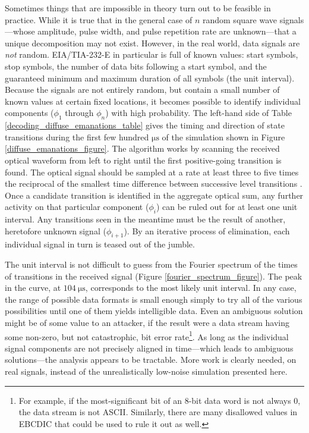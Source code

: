 \documentclass{acmtrans2e}
\begin{document}
Sometimes things that are impossible in theory turn out to be feasible
in practice.  While it is true that in the general case of $n$ random square
wave signals---whose amplitude, pulse width, and pulse repetition rate are
unknown---that a unique decomposition may not exist.  However, in the real
world, data signals are {\it not} random.  EIA/TIA-232-E in particular is full
of known values: start symbols, stop symbols, the number of data bits following
a start symbol, and the guaranteed minimum and maximum duration of all symbols
(the unit interval).  Because the signals are not entirely random, but contain
a small number of known values at certain fixed locations, it becomes possible
to identify individual components ($\phi_1$ through $\phi_n$) with high
probability.  The left-hand side of Table \ref{decoding_diffuse_emanations_table}
gives the timing and direction of state transitions during the first few hundred
$\mathrm{\mu s}$ of the simulation shown in Figure \ref{diffuse_emanations_figure}.
The algorithm works by scanning the received optical waveform from left to
right until the first positive-going transition is found.  The optical signal
should be sampled at a rate at least three to five times the reciprocal of the
smallest time difference between successive level transitions \cite{McCarthy}.
Once a candidate transition is identified in the aggregate optical sum, any further
activity on that particular component ($\phi_i$) can be ruled out for at least
one unit interval.  Any transitions seen in the meantime must be the result of
another, heretofore unknown signal ($\phi_{i+1}$).  By an iterative process of
elimination, each individual signal in turn is teased out of the jumble.

The unit interval is not difficult to guess from the Fourier spectrum of the
times of transitions in the received signal
(Figure \ref{fourier_spectrum_figure}).  The peak in the curve, at
$104 \ \mathrm{\mu s}$, corresponds to the most likely unit interval.  In
any case, the range of possible data formats is small enough simply
to try all of the various possibilities until one of them yields intelligible data.
Even an ambiguous solution might be of some value to an attacker, if the result
were a data stream having some non-zero, but not catastrophic, bit error
rate\footnote{For example, if the most-significant bit of an 8-bit data word
is not always 0, the data stream is not ASCII.  Similarly, there are many
disallowed values in EBCDIC that could be used to rule it out as well.}.
As long as the individual signal components are not precisely aligned in
time---which leads to ambiguous solutions---the analysis appears to be tractable.
More work is clearly needed, on real signals, instead of the unrealistically
low-noise simulation presented here.
\end{document}
